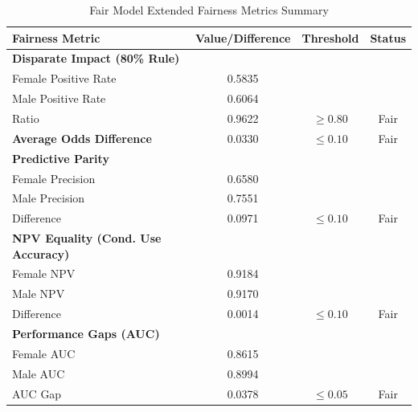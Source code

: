 \documentclass[11pt,a4paper]{article}
\begin{document}
\begin{table}[h]
\centering
\caption{Fair Model Extended Fairness Metrics Summary}
\label{tab:fair_fairness_metrics}
\begin{tabular}{|l|c|c|c|}
\hline
\textbf{Fairness Metric} & \textbf{Value/Difference} & \textbf{Threshold} & \textbf{Status} \\
\hline
\textbf{Disparate Impact (80\% Rule)} &  &  &  \\
\quad Female Positive Rate & 0.5835 &  &  \\
\quad Male Positive Rate & 0.6064 &  &  \\
\quad Ratio & 0.9622 & $\geq 0.80$ & Fair  \\
\hline
\textbf{Average Odds Difference} & 0.0330 & $\leq 0.10$ & Fair  \\
\hline
\textbf{Predictive Parity} &  &  &  \\
\quad Female Precision & 0.6580 &  &  \\
\quad Male Precision & 0.7551 &  &  \\
\quad Difference & 0.0971 & $\leq 0.10$ & Fair  \\
\hline
\textbf{NPV Equality (Cond. Use Accuracy)} &  &  &  \\
\quad Female NPV & 0.9184 &  &  \\
\quad Male NPV & 0.9170 &  &  \\
\quad Difference & 0.0014 & $\leq 0.10$ & Fair  \\
\hline
\textbf{Performance Gaps (AUC)} &  &  &  \\
\quad Female AUC & 0.8615 &  &  \\
\quad Male AUC & 0.8994 &  &  \\
\quad AUC Gap & 0.0378 & $\leq 0.05$ & Fair  \\
\hline
\end{tabular}
\end{table}
\end{document}
